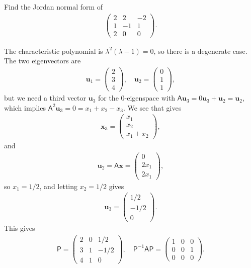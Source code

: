 \documentclass[letter-paper]{tufte-book}
\newenvironment{example}[1][Example]{\begin{trivlist}
\item[\hskip \labelsep {\bfseries #1}]}{\end{trivlist}}
\newcommand{\As}{{\mathsf{A}}}
\newcommand{\Ps}{{\mathsf{P}}}
\newcommand{\ub}{{\boldsymbol{u}}}
\newcommand{\xb}{{\boldsymbol{x}}}
\begin{document}
\begin{example}
  Find the Jordan normal form of
  \begin{align*}
    \begin{pmatrix} 2 & 2 & -2 \\ 1 & -1 & 1 \\ 2 & 0 & 0 \end{pmatrix}.
  \end{align*}
  
  The characteristic polynomial is $\lambda^2(\lambda-1) = 0$, so there is a degenerate case. The two eigenvectors are
  \begin{align*}
    \ub_1 = \begin{pmatrix} 2 \\ 3 \\ 4 \end{pmatrix}, \quad
    \ub_2 = \begin{pmatrix} 0 \\ 1 \\ 1 \end{pmatrix},
  \end{align*}
  but we need a third vector $\ub_3$ for the 0-eigenspace with $\As \ub_3 = 0 \ub_3 + \ub_2 = \ub_2$, which implies $\As^2 \ub_3 = 0 = x_1 + x_2 - x_3$. We see that gives
  \begin{align*}
    \xb_3 = \begin{pmatrix} x_1 \\ x_2 \\ x_1 + x_2 \end{pmatrix},
  \end{align*}
  and
  \begin{align*}
    \ub_2 = \As \xb = \begin{pmatrix} 0 \\ 2x_1 \\ 2x_1 \end{pmatrix},
  \end{align*}
  so $x_1 = 1/2$, and letting $x_2 = 1/2$ gives
  \begin{align*}
    \ub_3 = \begin{pmatrix} 1/2 \\ -1/2 \\ 0 \end{pmatrix}.
  \end{align*}
  This gives
  \begin{align*}
    \Ps = \begin{pmatrix} 2 & 0 & 1/2 \\ 3 & 1 & -1/2 \\ 4 & 1 & 0 \end{pmatrix}, \quad \Ps^{-1}\As\Ps = \begin{pmatrix} 1 & 0 & 0 \\ 0 & 0 & 1 \\ 0 & 0 & 0 \end{pmatrix}.
  \end{align*}
\end{example}
\end{document}

